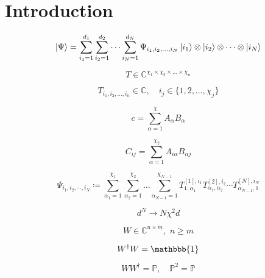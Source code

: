 \documentclass{article}
\newcommand{\id}{\mathbbb{1}}
\begin{document}
	


	\section{Introduction}	

	\begin{equation}
		\ket{\Psi} = \sum_{i_1=1}^{d_1} \sum_{i_2=1}^{d_2} \cdots \sum_{i_N=1}^{d_N} \Psi_{i_1,i_2,\dots,i_N} \ket{i_1} \otimes \ket{i_2} \otimes \cdots \otimes \ket{i_N} 
	\end{equation}
	
	\begin{equation} %
		T \in \mathbb{C}^{\chi_1\times\chi_2\times\dots\times\chi_n}
	\end{equation}
	
	\begin{equation} %
		T_{i_1,i_2,\dots,i_n} \in \mathbb{C}, \quad i_j \in \{1, 2, \dots, \chi_j\}
	\end{equation}
	
	\begin{equation}
		c = \sum_{\alpha=1}^{\chi}A_\alpha B_\alpha
	\end{equation}
		
	\begin{equation}
		C_{ij} = \sum_{\alpha=1}^{\chi_2} A_{i\alpha} B_{\alpha j}
	\end{equation}
	
	\begin{equation}
	\Psi_{i_1,i_2,\cdots,i_N} \coloneqq \sum_{\alpha_1=1}^{\chi_1} \sum_{\alpha_2=1}^{\chi_2}\dots\sum_{\alpha_{N-1}=1}^{\chi_{N-1}}T^{[1],i_1}_{1,\alpha_1} T^{[2],i_2}_{\alpha_1,\alpha_2} \cdots T^{[N],i_N}_{\alpha_{N-1},1}
	\end{equation}
	
	\begin{equation}
	d^N \rightarrow N\chi^2d
	\end{equation}
	
	\begin{equation}
	W \in \mathbb{C}^{n\times m}, \,\, n\ge m
	\end{equation}
	
	\begin{equation}
	W^\dagger W = \id
	\end{equation}
	
	\begin{equation}
	WW^\dagger = \mathbb{P}, \quad \mathbb{P}^2 = \mathbb{P}
	\end{equation}
	
\end{document}
